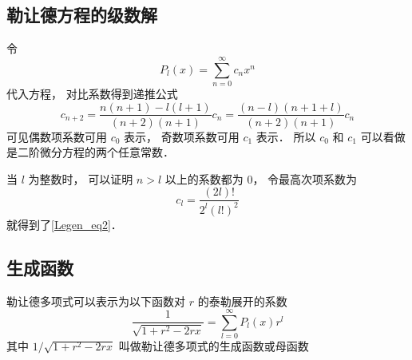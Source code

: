 \subsection{勒让德方程的级数解}
令
\begin{equation}
P_l(x) = \sum_{n = 0}^\infty c_n x^n
\end{equation}
代入方程， 对比系数得到递推公式
\begin{equation}
c_{n+2} = \frac{n(n+1)-l(l+1)}{(n+2)(n+1)}c_n = \frac{(n-l)(n+1+l)}{(n+2)(n+1)}c_n
\end{equation}
可见偶数项系数可用 $c_0$ 表示， 奇数项系数可用 $c_1$ 表示． 所以 $c_0$ 和 $c_1$ 可以看做是二阶微分方程的两个任意常数．

当 $l$ 为整数时， 可以证明 $n > l$ 以上的系数都为 0， 令最高次项系数为
\begin{equation}
c_l = \frac{(2l)!}{2^l (l!)^2}
\end{equation}
就得到了\autoref{Legen_eq2}．

\subsection{生成函数}
勒让德多项式可以表示为以下函数对 $r$ 的泰勒展开的系数
\begin{equation}
\frac{1}{\sqrt{1 + r^2 - 2rx}} = \sum_{l = 0}^\infty P_l(x) r^l
\end{equation}
其中 $1/\sqrt {1+ r^2 - 2rx}$ 叫做勒让德多项式的生成函数或母函数